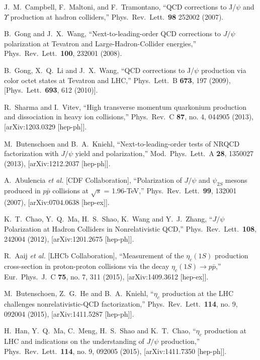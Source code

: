 \documentclass[aps,prc,preprint,superscriptaddress,showpacs,showkeys,amsmath]{revtex4-1}
\begin{document}
\begin{thebibliography}{100}
  J.~M.~Campbell, F.~Maltoni, and F.~Tramontano,
  ``QCD corrections to J/$\psi$ and $\Upsilon$ production at hadron colliders,''
  Phys.\ Rev.\ Lett.\  {\bf 98} 252002 (2007).


  B.~Gong and J.~X.~Wang,
  ``Next-to-leading-order QCD corrections to $J/\psi$ polarization at Tevatron and Large-Hadron-Collider energies,''
  Phys.\ Rev.\ Lett.\  {\bf 100}, 232001 (2008).
  

  B.~Gong, X.~Q.~Li and J.~X.~Wang,
  ``QCD corrections to J/$\psi$ production via color octet states at Tevatron and LHC,''
  Phys.\ Lett.\ B {\bf 673}, 197 (2009),
  [Phys.\ Lett.\  {\bf 693}, 612 (2010)].


  R.~Sharma and I.~Vitev,
  ``High transverse momentum quarkonium production and dissociation in heavy ion collisions,''
  Phys.\ Rev.\ C {\bf 87}, no. 4, 044905 (2013), [arXiv:1203.0329 [hep-ph]].



  M.~Butenschoen and B.~A.~Kniehl,
  ``Next-to-leading-order tests of NRQCD factorization with $J/\psi$ yield and polarization,''
  Mod.\ Phys.\ Lett.\ A {\bf 28}, 1350027 (2013), [arXiv:1212.2037 [hep-ph]].

  A.~Abulencia {\it et al.} [CDF Collaboration],
  ``Polarization of $J/\psi$ and $\psi_{2S}$ mesons produced in $p \bar{p}$ collisions at $\sqrt{s}$ = 1.96-TeV,''
  Phys.\ Rev.\ Lett.\  {\bf 99}, 132001 (2007), [arXiv:0704.0638 [hep-ex]].

  K.~T.~Chao, Y.~Q.~Ma, H.~S.~Shao, K.~Wang and Y.~J.~Zhang,
  ``$J/\psi$ Polarization at Hadron Colliders in Nonrelativistic QCD,''
  Phys.\ Rev.\ Lett.\  {\bf 108}, 242004 (2012), [arXiv:1201.2675 [hep-ph]].
  

  R.~Aaij {\it et al.} [LHCb Collaboration],
  ``Measurement of the $\eta_c (1S)$ production cross-section in proton-proton collisions via the decay $\eta_c (1S) \rightarrow p \bar{p}$,''
  Eur.\ Phys.\ J.\ C {\bf 75}, no. 7, 311 (2015), [arXiv:1409.3612 [hep-ex]].
 

  M.~Butenschoen, Z.~G.~He and B.~A.~Kniehl,
  ``$\eta_c$ production at the LHC challenges nonrelativistic-QCD factorization,''
  Phys.\ Rev.\ Lett.\  {\bf 114}, no. 9, 092004 (2015), [arXiv:1411.5287 [hep-ph]].


  H.~Han, Y.~Q.~Ma, C.~Meng, H.~S.~Shao and K.~T.~Chao,
  ``$\eta_c$ production at LHC and indications on the understanding of $J/\psi$ production,''
  Phys.\ Rev.\ Lett.\  {\bf 114}, no. 9, 092005 (2015), [arXiv:1411.7350 [hep-ph]].
  


\end{thebibliography}
\end{document}
